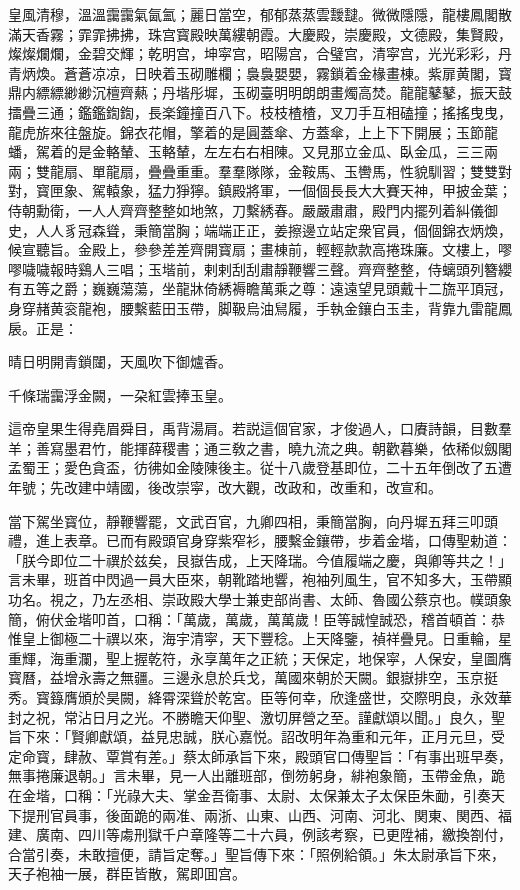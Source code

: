 \begin{myquote}
皇風清穆，溫溫靄靄氣氤氳；麗日當空，郁郁蒸蒸雲靉靆。微微隱隱，龍樓鳳閣散滿天香霧；霏霏拂拂，珠宫寳殿映萬縷朝霞。大慶殿，崇慶殿，文德殿，集賢殿，燦燦爛爛，金碧交輝；乾明宫，坤寜宫，昭陽宫，合璧宫，清寜宫，光光彩彩，丹青炳煥。蒼蒼凉凉，日映着玉砌雕欄；裊裊嬰嬰，霧鎖着金椽畫棟。紫扉黄閣，寳鼎内縹縹緲緲沉檀齊爇；丹堦彤墀，玉砌臺明明朗朗畫燭高焚。龍龍鼕鼕，振天鼓擂疊三通；鑑鑑鍧鍧，長楽鐘撞百八下。枝枝楂楂，叉刀手互相磕撞；搖搖曳曳，龍虎旂來往盤旋。錦衣花帽，擎着的是圓蓋傘、方蓋傘，上上下下開展；玉節龍蟠，駕着的是金輅輦、玉輅輦，左左右右相陳。又見那立金瓜、臥金瓜，三三兩兩；雙龍扇、單龍扇，疊疊重重。羣羣隊隊，金鞍馬、玉轡馬，性貌馴習；雙雙對對，寳匣象、駕轅象，猛力猙獰。鎮殿將軍，一個個長長大大賽天神，甲披金葉；侍朝勳衛，一人人齊齊整整如地煞，刀繫綉春。嚴嚴肅肅，殿門内擺列着糾儀御史，人人豸冠森聳，秉簡當胸；端端正正，姜擦邊立站定衆官員，個個錦衣炳煥，候宣聽旨。金殿上，參參差差齊開寳扇；畫棟前，輕輕款款高捲珠廉。文樓上，嘐嘐噦噦報時鷄人三唱；玉堦前，剌剌刮刮肅靜鞭響三聲。齊齊整整，侍螭頭列簪纓有五等之爵；巍巍蕩蕩，坐龍牀倚綉褥瞻萬乘之尊：遠遠望見頭戴十二旒平頂冠，身穿赭黄衮龍袍，腰繫藍田玉帶，脚靸烏油舃履，手執金鑲白玉圭，背靠九雷龍鳳扆。正是：

晴日明開青鎖闥，天風吹下御爐香。

千條瑞靄浮金闕，一朶紅雲捧玉皇。
\end{myquote}

這帝皇果生得堯眉舜目，禹背湯肩。若説這個官家，才俊過人，口賡詩韻，目數羣羊；善寫墨君竹，能揮薛稷書；通三敎之書，曉九流之典。朝歡暮樂，依稀似劔閣孟蜀王；愛色貪盃，彷彿如金陵陳後主。従十八歲登基即位，二十五年倒改了五遭年號；先改建中靖國，後改崇寜，改大觀，改政和，改重和，改宣和。

當下駕坐寳位，靜鞭響罷，文武百官，九卿四相，秉簡當胸，向丹墀五拜三叩頭禮，進上表章。已而有殿頭官身穿紫窄衫，腰繫金鑲帶，步着金堦，口傳聖勅道：「朕今即位二十禩於兹矣，艮嶽告成，上天降瑞。今值履端之慶，與卿等共之！」言未畢，班首中閃過一員大臣來，朝靴踏地響，袍袖列風生，官不知多大，玉帶顯功名。視之，乃左丞相、崇政殿大學士兼吏部尚書、太師、魯國公蔡京也。幞頭象簡，俯伏金堦叩首，口稱：「萬歲，萬歲，萬萬歲！臣等誠惶誠恐，稽首頓首：恭惟皇上御極二十禩以來，海宇清寜，天下豐稔。上天降鑒，禎祥疊見。日重輪，星重輝，海重瀾，聖上握乾符，永享萬年之正統；天保定，地保寜，人保安，皇圖膺寳曆，益增永壽之無疆。三邊永息於兵戈，萬國來朝於天闕。銀嶽排空，玉京挺秀。寳籙膺頒於昊闕，絳霄深聳於乾宮。臣等何幸，欣逢盛世，交際明良，永效華封之祝，常沾日月之光。不勝瞻天仰聖、激切屏營之至。謹獻頌以聞。」良久，聖旨下來：「賢卿獻頌，益見忠誠，朕心嘉悦。詔改明年為重和元年，正月元旦，受定命寳，肆赦、覃賞有差。」蔡太師承旨下來，殿頭官口傳聖旨：「有事出班早奏，無事捲廉退朝。」言未畢，見一人出離班部，倒笏躬身，緋袍象簡，玉帶金魚，跪在金堦，口稱：「光祿大夫、掌金吾衛事、太尉、太保兼太子太保臣朱勔，引奏天下提刑官員事，後面跪的兩准、兩浙、山東、山西、河南、河北、関東、関西、福建、廣南、四川等䖏刑獄千户章隆等二十六員，例該考察，已更陞補，繳換劄付，合當引奏，未敢擅便，請旨定奪。」聖旨傳下來：「照例給領。」朱太尉承旨下來，天子袍袖一展，群臣皆散，駕即囬宫。

